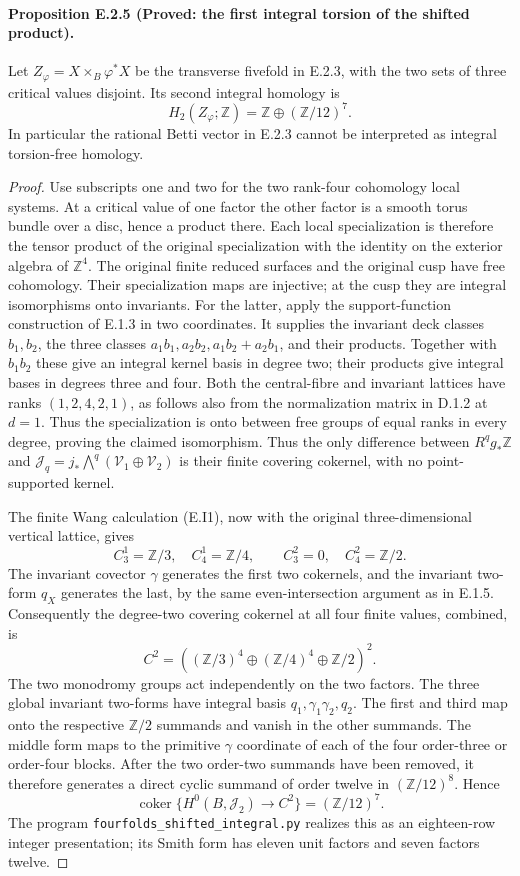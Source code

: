 \paragraph{Proposition E.2.5 (Proved: the first integral torsion of the shifted product).}
Let \(Z_\varphi=X\times_B\varphi^*X\) be the transverse
fivefold in E.2.3, with the two sets of three critical values
disjoint. Its second integral homology is
\[
 H_2(Z_\varphi;\mathbb Z)
   =\mathbb Z\oplus(\mathbb Z/12)^7.
\]
In particular the rational Betti vector in E.2.3 cannot be
interpreted as integral torsion-free homology.
\begin{proof}
Use subscripts one and two for the two rank-four cohomology
local systems. At a critical value of one factor the other
factor is a smooth torus bundle over a disc, hence a product
there. Each local specialization is therefore the tensor
product of the original specialization with the identity on
the exterior algebra of \(\mathbb Z^4\). The original finite
reduced surfaces and the original cusp have free cohomology.
Their specialization maps are injective; at the cusp they
are integral isomorphisms onto invariants. For the latter,
apply the support-function construction of E.1.3 in two
coordinates. It supplies the invariant deck classes
\(b_1,b_2\), the three classes
\(a_1b_1,a_2b_2,a_1b_2+a_2b_1\), and their products.
Together with \(b_1b_2\) these give an integral kernel
basis in degree two; their products give integral bases
in degrees three and four. Both the central-fibre and
invariant lattices have ranks \((1,2,4,2,1)\), as follows
also from the normalization matrix in D.1.2 at \(d=1\).
Thus the specialization is onto between free groups of
equal ranks in every degree, proving the claimed isomorphism.
Thus the only difference between \(R^qg_*\mathbb Z\) and
\(\mathcal J_q=j_*\bigwedge^q(\mathcal V_1\oplus\mathcal V_2)\)
is their finite covering cokernel, with no point-supported kernel.

The finite Wang calculation (E.I1), now with the original
three-dimensional vertical lattice, gives
\[
 C_3^1=\mathbb Z/3,\quad C_4^1=\mathbb Z/4,
 \qquad C_3^2=0,\quad C_4^2=\mathbb Z/2.
\]
The invariant covector \(\gamma\) generates the first two
cokernels, and the invariant two-form \(q_X\) generates the
last, by the same even-intersection argument as in E.1.5.
Consequently the degree-two covering cokernel at all four
finite values, combined, is
\[
 C^2=\left((\mathbb Z/3)^4\oplus
                 (\mathbb Z/4)^4\oplus\mathbb Z/2\right)^2.
\]
The two monodromy groups act independently on the two factors.
The three global invariant two-forms have integral basis
\(q_1,\gamma_1\gamma_2,q_2\). The first and third map
onto the respective \(\mathbb Z/2\) summands and vanish
in the other summands. The middle form maps to the primitive
\(\gamma\) coordinate of each of the four order-three or
order-four blocks. After the two order-two summands have
been removed, it therefore generates a direct cyclic summand
of order twelve in \((\mathbb Z/12)^8\). Hence
\[
 \operatorname{coker}\{H^0(B,\mathcal J_2)\to C^2\}
      =(\mathbb Z/12)^7.
 \tag{E.20}
\]
The program \texttt{fourfolds\_shifted\_integral.py} realizes
this as an eighteen-row integer presentation; its Smith form
has eleven unit factors and seven factors twelve.


\end{proof}
